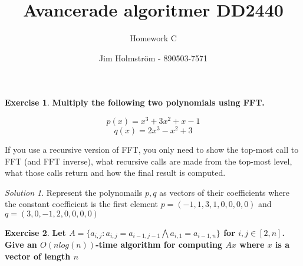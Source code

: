 \documentclass[a4paper,twoside=false,abstract=false,numbers=noenddot,
titlepage=false,headings=small,parskip=half,version=last]{scrartcl}
\author{Jim Holmström - 890503-7571}
\title{Avancerade algoritmer DD2440}
\subtitle{Homework C}
\theoremstyle{definition}
\newtheorem{exercise}{Exercise}
\theoremstyle{remark}
\newtheorem*{solution}{Solution}
\begin{document}
\maketitle
\thispagestyle{empty}

\begin{exercise}
{\bf
Multiply the following two polynomials using FFT.

\begin{equation*}
p(x)=x^3+3x^2+x-1
\end{equation*}
\begin{equation*}
q(x)=2x^3-x^2+3
\end{equation*}

If you use a recursive version of FFT, you only need
to show the top-most call to FFT (and FFT inverse),
what recursive calls are made from the top-most level,
what those calls return and how the final result is computed.
}
\end{exercise}
\begin{solution}
Represent the polynomails $p,q$ as vectors of their coefficients where the constant coefficient is the first element $p=(-1,1,3,1,0,0,0,0)$ and $q=(3,0,-1,2,0,0,0,0)$


\end{solution}
\begin{exercise}
{\bf
Let $A = \{ a_{i,j} : a_{i,j} = a_{i-1,j-1} \bigwedge a_{i,1} = a_{i-1,n} \}$
for $i,j \in [2,n]$. 
Give an $O(n log(n))$-time algorithm for computing $Ax$ where $x$ is a vector of length $n$
}
\end{exercise}
\end{document}

